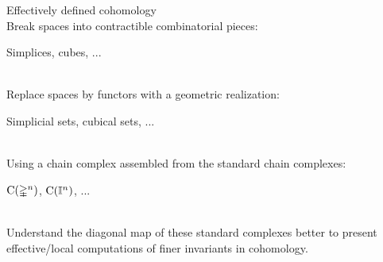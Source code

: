 \begin{frame}{Effectively defined cohomology}
	\pause
	 \\
	Break spaces into contractible combinatorial pieces: \\
	\begin{center}
		Simplices, cubes, ...
	\end{center}

	\pause
	 \\
	Replace spaces by functors with a geometric realization: \\
	\begin{center}
		Simplicial sets, cubical sets, ...
	\end{center}

	\pause
	 \\
	Using a chain complex assembled from the standard chain complexes: \\
	\begin{center}
		$\operatorname{C}(\mathbb{\Delta}^n)$, $\operatorname{C}(\mathbb{I}^n)$, ...
	\end{center}

	\pause
	 \\
	Understand the diagonal map of these standard complexes better to
	present effective/local computations of finer invariants in cohomology.
\end{frame}